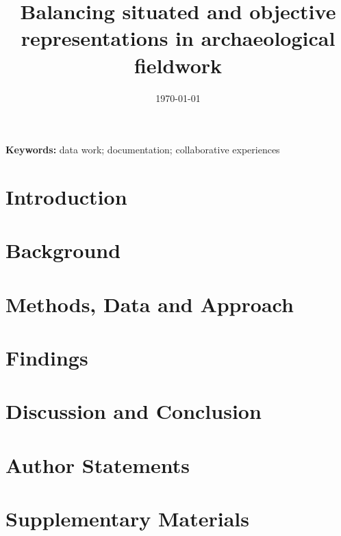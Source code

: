 \documentclass[12pt]{article}
\begin{document}
\title{Balancing situated and objective representations in archaeological fieldwork}
\date{\today}
\maketitle

\begin{abstract}
  
\end{abstract}

\providecommand{\keywords}[1]{\textbf{{Keywords:}} #1}
\keywords{data work; documentation; collaborative experiences}

\section*{Introduction}


\section*{Background}


\section*{Methods, Data and Approach}


\section*{Findings}


\section*{Discussion and Conclusion}




\newpage
\section*{Author Statements}



\newpage
\printbibliography

\newpage
\section*{Supplementary Materials}

\end{document}
